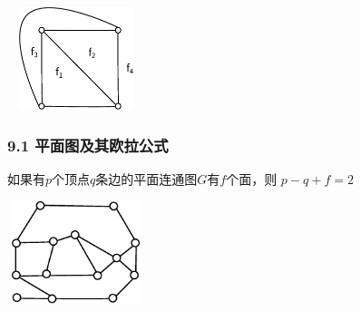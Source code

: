 \documentclass{beamer}
\begin{document}
\begin{CJK}{UTF8}{gbsn}
\begin{frame}
\begin{definition9.1.2}
\includegraphics[width=4cm,height=3cm]{face}
  \end{definition9.1.2}
\end{frame}
\begin{frame}
  \frametitle{9.1 平面图及其欧拉公式}
  \begin{theorem9.1.1}
    如果有$p$个顶点$q$条边的平面连通图$G$有$f$个面，则
      $p - q + f = 2$
  \end{theorem9.1.1}
\vspace{1cm}
\centering
    \includegraphics[width=4cm,height=3cm]{euler}
\end{frame}


\end{CJK}
\end{document}
